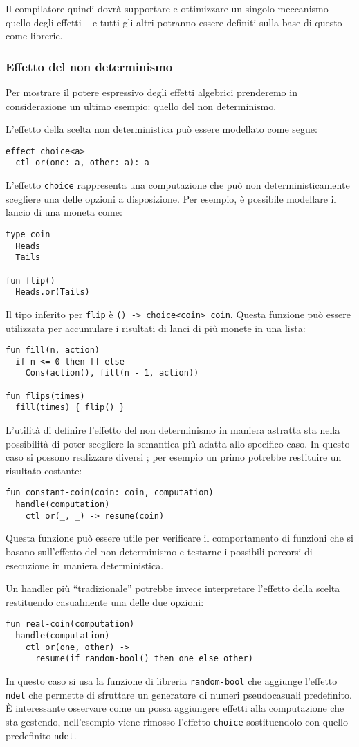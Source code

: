 Il compilatore quindi dovrà supportare e ottimizzare un singolo meccanismo -- quello degli effetti -- e tutti gli altri potranno essere definiti sulla base di questo come librerie.

\subsubsection{Effetto del non determinismo}
Per mostrare il potere espressivo degli effetti algebrici prenderemo in considerazione un ultimo esempio: quello del non determinismo.

L'effetto della scelta non deterministica può essere modellato come segue:
\begin{lstlisting}[language=koka]
effect choice<a>
  ctl or(one: a, other: a): a
\end{lstlisting}
L'effetto \lstinline{choice} rappresenta una computazione che può non deterministicamente scegliere una delle opzioni a disposizione.
Per esempio, è possibile modellare il lancio di una moneta come:
\begin{lstlisting}[language=koka]
type coin
  Heads
  Tails

fun flip()
  Heads.or(Tails)
\end{lstlisting}
Il tipo inferito per \lstinline{flip} è \lstinline{() -> choice<coin> coin}. Questa funzione può essere utilizzata per accumulare i risultati di lanci di più monete in una lista:
\begin{lstlisting}[language=koka]
fun fill(n, action)
  if n <= 0 then [] else
    Cons(action(), fill(n - 1, action))

fun flips(times)
  fill(times) { flip() }
\end{lstlisting}
L'utilità di definire l'effetto del non determinismo in maniera astratta sta nella possibilità di poter scegliere la semantica più adatta allo specifico caso. In questo caso si possono realizzare diversi ; per esempio un primo  potrebbe restituire un risultato costante:
\begin{lstlisting}[language=koka]
fun constant-coin(coin: coin, computation)
  handle(computation)
    ctl or(_, _) -> resume(coin)
\end{lstlisting}
Questa funzione può essere utile per verificare il comportamento di funzioni che si basano sull'effetto del non determinismo e testarne i possibili percorsi di esecuzione in maniera deterministica.

Un handler più ``tradizionale'' potrebbe invece interpretare l'effetto della scelta restituendo casualmente una delle due opzioni:
\begin{lstlisting}[language=koka]
fun real-coin(computation)
  handle(computation)
    ctl or(one, other) ->
      resume(if random-bool() then one else other)
\end{lstlisting}
In questo caso si usa la funzione di libreria \lstinline{random-bool} che aggiunge l'effetto \lstinline{ndet} che permette di sfruttare un generatore di numeri pseudocasuali predefinito. È interessante osservare come un  possa aggiungere effetti alla computazione che sta gestendo, nell'esempio viene rimosso l'effetto \lstinline{choice} sostituendolo con quello predefinito \lstinline{ndet}.

